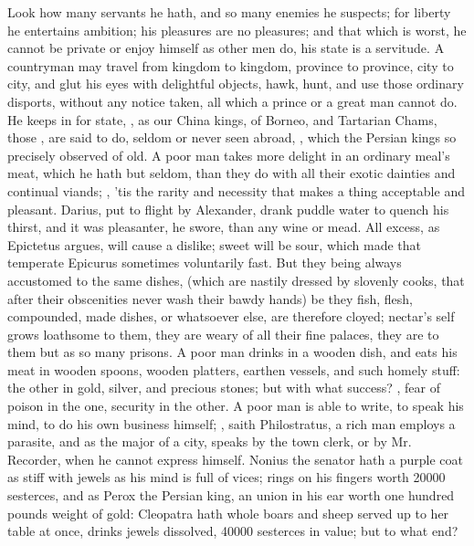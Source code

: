 {Look how many servants he hath, and so many enemies he suspects; for liberty he entertains ambition; his pleasures are no pleasures; and that which is worst, he cannot be private or enjoy himself as other men do, his state is a servitude. A countryman may travel from kingdom to kingdom, province to province, city to city, and glut his eyes with delightful objects, hawk, hunt, and use those ordinary disports, without any notice taken, all which a prince or a great man cannot do. He keeps in for state, , as our China kings, of Borneo, and Tartarian Chams, those , are said to do, seldom or never seen abroad, , which the Persian kings so precisely observed of old. A poor man takes more delight in an ordinary meal's meat, which he hath but seldom, than they do with all their exotic dainties and continual viands; , 'tis the rarity and necessity that makes a thing acceptable and pleasant. Darius, put to flight by Alexander, drank puddle water to quench his thirst, and it was pleasanter, he swore, than any wine or mead. All excess, as Epictetus argues, will cause a dislike; sweet will be sour, which made that temperate Epicurus sometimes voluntarily fast. But they being always accustomed to the same dishes, (which are nastily dressed by slovenly cooks, that after their obscenities never wash their bawdy hands) be they fish, flesh, compounded, made dishes, or whatsoever else, are therefore cloyed; nectar's self grows loathsome to them, they are weary of all their fine palaces, they are to them but as so many prisons. A poor man drinks in a wooden dish, and eats his meat in wooden spoons, wooden platters, earthen vessels, and such homely stuff: the other in gold, silver, and precious stones; but with what success? , fear of poison in the one, security in the other. A poor man is able to write, to speak his mind, to do his own business himself; , saith Philostratus, a rich man employs a parasite, and as the major of a city, speaks by the town clerk, or by Mr. Recorder, when he cannot express himself. Nonius the senator hath a purple coat as stiff with jewels as his mind is full of vices; rings on his fingers worth 20\thinspace{}000 sesterces, and as Perox the Persian king, an union in his ear worth one hundred pounds weight of gold: Cleopatra hath whole boars and sheep served up to her table at once, drinks jewels dissolved, 40\thinspace{}000 sesterces in value; but to what end?

}

